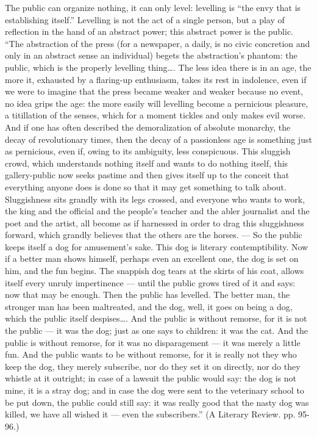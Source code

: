 \documentclass[12pt,a4paper,openany]{book}
\newcommand{\opage}[1]{\marginnote{\footnotesize\textit{[#1]}}}
\begin{document}
The public can organize nothing, it can only level:
levelling is ``the envy that is establishing itself.''
Levelling is not the act of a single person, but a play of reflection
in the hand of an abstract power; this abstract
power is the public. ``The abstraction of the press (for
a newspaper, a daily, is no civic concretion and
only in an abstract sense an individual) begets the abstraction's
phantom: the public, which is the properly levelling thing\dots{}.
The less idea there is in an age, the more
it, exhausted by a flaring-up enthusiasm, takes its rest
in indolence, even if we were to imagine that the press became
weaker and weaker because no event, no idea
grips the age: the more easily will levelling become
a pernicious pleasure, a titillation of the senses, which for a moment tickles
and only makes evil worse. And if one has often
described the demoralization of absolute monarchy, the decay
of revolutionary times, then the decay of a passionless age
is something just as pernicious, even if, owing to its ambiguity,
less conspicuous. This sluggish crowd,
which understands nothing itself and wants to do nothing itself, this
gallery-public now seeks pastime and then gives itself up
to the conceit that everything anyone does is done
so that it may get something to talk about. Sluggishness
sits grandly with its legs crossed, and everyone who wants to
work, the king and the official and the people's teacher
and the abler journalist and the poet and the artist,
all become as if harnessed in order to drag this
sluggishness forward, which grandly believes that the others are the horses.
--- So the public keeps itself a dog for
\setcounter{footnote}{0}%
\opage{17}amusement's sake. This dog is literary contemptibility.
Now if a better man shows himself, perhaps even an excellent one,
the dog is set on him, and the fun begins.
The snappish dog tears at the skirts of his coat, allows itself
every unruly impertinence --- until the public grows tired
of it and says: now that may be enough. Then the public has
levelled. The better man, the stronger man has been maltreated, and
the dog, well, it goes on being a dog, which the public
itself despises\dots{}. And the public is without remorse, for it
is not the public --- it was the dog; just as
one says to children: it was the cat. And the public is
without remorse, for it was no disparagement --- it was
merely a little fun. And the public wants to be without remorse, for
it is really not they who keep the dog, they merely subscribe,
nor do they set it on directly, nor
do they whistle at it outright; in case of a lawsuit
the public would say: the dog is not mine, it is
a stray dog; and in case the dog were
sent to the veterinary school to be put down, the
public could still say: it was really good that the
nasty dog was killed, we have all wished it --- even
the subscribers.'' (A Literary Review. pp. 95-96.)
\end{document}
